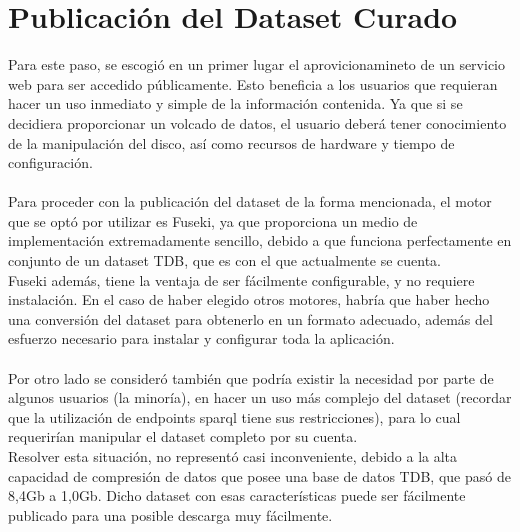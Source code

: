 \chapter{Publicación del Dataset Curado}
\label{chapter:publicacion}

Para este paso, se escogió en un primer lugar el aprovicionamineto de un servicio web para ser accedido públicamente. Esto beneficia 
a los usuarios que requieran hacer un uso inmediato y simple de la información contenida. Ya que si se decidiera proporcionar un 
volcado de datos, el usuario deberá tener conocimiento de la manipulación del disco, así como recursos de hardware y tiempo de configuración.\\
\\
Para proceder con la publicación del dataset de la forma mencionada, el motor que se optó por utilizar es Fuseki, ya que proporciona un
medio de implementación extremadamente sencillo, debido a que funciona perfectamente en conjunto de un dataset TDB, que es con el que 
actualmente se cuenta. \\
Fuseki además, tiene la ventaja de ser fácilmente configurable, y no requiere instalación. En el caso de haber elegido otros motores, 
habría que haber hecho una conversión del dataset para obtenerlo en un formato adecuado, además del esfuerzo necesario para instalar y configurar 
toda la aplicación.\\
\\
Por otro lado se consideró también que podría existir la necesidad por parte de algunos usuarios (la minoría), en hacer un uso más complejo del 
dataset (recordar que la utilización de endpoints sparql tiene sus restricciones), para lo cual requerirían manipular el dataset completo 
por su cuenta.\\
Resolver esta situación, no representó casi inconveniente, debido a la alta capacidad de compresión de datos que posee una base de datos TDB, 
que pasó de 8,4Gb a 1,0Gb. Dicho dataset con esas características puede ser fácilmente publicado para una posible descarga muy fácilmente. 